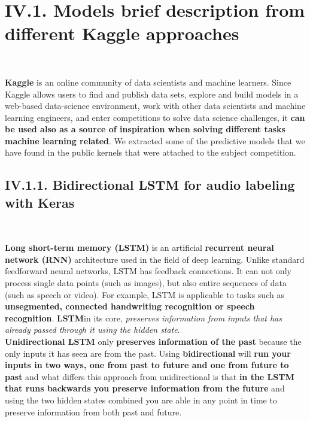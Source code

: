 \documentclass[11pt, a4papper]{report}
\theoremstyle{plain}
\theoremstyle{definition}
\theoremstyle{definition}
\theoremstyle{proposition}
\begin{document}
\section*{IV.1. Models brief description from different Kaggle approaches}
\

\textbf{Kaggle} \cite{9} is an online community of data scientists and machine learners. Since Kaggle allows users to find and publish data sets, explore and build models in a web-based data-science environment, work with other data scientists and machine learning engineers, and enter competitions to solve data science challenges, it \textbf{can be used also as a source of inspiration when solving different tasks machine learning related}. We extracted some of the predictive models that we have found in the public kernels that were attached to the subject competition.

\subsection*{IV.1.1. Bidirectional LSTM for audio labeling with Keras}
\

\textbf{Long short-term memory (LSTM)} is an artificial \textbf{recurrent neural network (RNN)} architecture used in the field of deep learning. Unlike standard feedforward neural networks, LSTM has feedback connections. It can not only process single data points (such as images), but also entire sequences of data (such as speech or video). For example, LSTM is applicable to tasks such as \textbf{unsegmented, connected handwriting recognition or speech recognition}. \textbf{LSTM}in its core, \textit{preserves information from inputs that has already passed through it using the hidden state}.
\\

\textbf{Unidirectional LSTM} only \textbf{preserves information of the past} because the only inputs it has seen are from the past. Using \textbf{bidirectional} will \textbf{run your inputs in two ways, one from past to future and one from future to past} and what differs this approach from unidirectional is that \textbf{in the LSTM that runs backwards you preserve information from the future} and using the two hidden states combined you are able in any point in time to preserve information from both past and future.
\\
\end{document}
